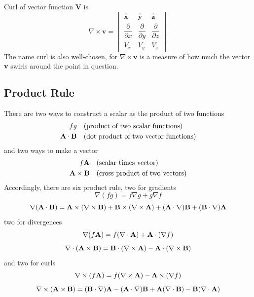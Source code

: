 \documentclass[../main.tex]{subfiles}
\begin{document}
Curl of vector function \textbf{V} is
\begin{equation*}
    \nabla \times  \mathbf{v}=
    \begin{vmatrix}
         \mathbf{\hat{x}}& \mathbf{\hat{y}}& \mathbf{\hat{z}}\\
        \dfrac{\partial }{\partial x}&\dfrac{\partial}{\partial y}&\dfrac{\partial }{\partial z}\\
        V_x&V_y&V_z
    \end{vmatrix} 
\end{equation*}
The name curl is also well-chosen, for $\nabla \times  \mathbf{v}$ is a measure of how much the vector \textbf{v} swirls around the point in question. 

\subsection{Product Rule}
There are two ways to construct a scalar as the product of two functions
\begin{align*}
    fg\quad&\text{(product of two scalar functions)}\\
    \mathbf{A}\cdot \mathbf{B}\quad&\text{(dot product of two vector functions)}
\end{align*}
and two ways to make a vector
\begin{align*}
    f\mathbf{A}\quad&\text{(scalar times vector)}\\
    \mathbf{A}\times \mathbf{B}\quad&\text{(cross product of two vectors)}
\end{align*}
Accordingly, there are six product rule, two for gradients
\begin{equation*}
    \nabla ( f g) = f \nabla g + g\nabla f
\end{equation*}
\begin{equation*}
    \nabla(\mathbf{A} \cdot \mathbf{B}) = \mathbf{A} \times (\nabla \times  \mathbf{B}) + \mathbf{B} \times  (\nabla \times  \mathbf{A}) + (\mathbf{A} \cdot \nabla)\mathbf{B} + (\mathbf{B} \cdot \nabla)\mathbf{A}
\end{equation*}
two for divergences
\begin{equation*}
    \nabla ( f \mathbf{A}) = f (\nabla \cdot \mathbf{A}) + \mathbf{A}\cdot(\nabla f)
\end{equation*}
\begin{equation*}
    \nabla\cdot (\mathbf{A} \times \mathbf{B}) = \mathbf{B}\cdot (\nabla \times  \mathbf{A})-\mathbf{A}\cdot (\nabla \times \mathbf{B})
\end{equation*}
and two for curls
\begin{equation*}
    \nabla \times ( f \mathbf{A}) = f (\nabla \times \mathbf{A}) - \mathbf{A} \times (\nabla f )
\end{equation*}
\begin{equation*}
    \nabla \times (\mathbf{A} \times \mathbf{B}) = (\mathbf{B} \cdot \nabla)\mathbf{A} - (\mathbf{A} \cdot \nabla)\mathbf{B} + \mathbf{A}(\nabla \cdot \mathbf{B}) - \mathbf{B}(\nabla \cdot \mathbf{A})
\end{equation*}
\end{document}
